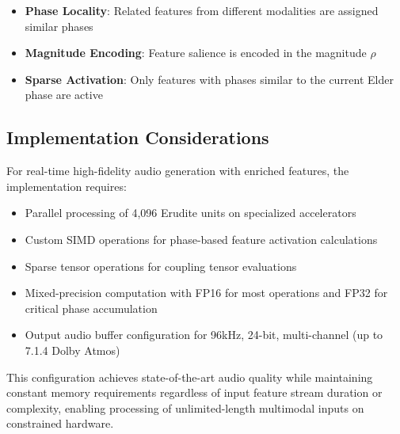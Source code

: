 \begin{itemize}
    \item \textbf{Phase Locality}: Related features from different modalities are assigned similar phases
    \item \textbf{Magnitude Encoding}: Feature salience is encoded in the magnitude $\rho$
    \item \textbf{Sparse Activation}: Only features with phases similar to the current Elder phase are active
\end{itemize}

\subsection{Implementation Considerations}

For real-time high-fidelity audio generation with enriched features, the implementation requires:

\begin{itemize}
    \item Parallel processing of 4,096 Erudite units on specialized accelerators
    \item Custom SIMD operations for phase-based feature activation calculations
    \item Sparse tensor operations for coupling tensor evaluations
    \item Mixed-precision computation with FP16 for most operations and FP32 for critical phase accumulation
    \item Output audio buffer configuration for 96kHz, 24-bit, multi-channel (up to 7.1.4 Dolby Atmos)
\end{itemize}

This configuration achieves state-of-the-art audio quality while maintaining constant memory requirements regardless of input feature stream duration or complexity, enabling processing of unlimited-length multimodal inputs on constrained hardware.